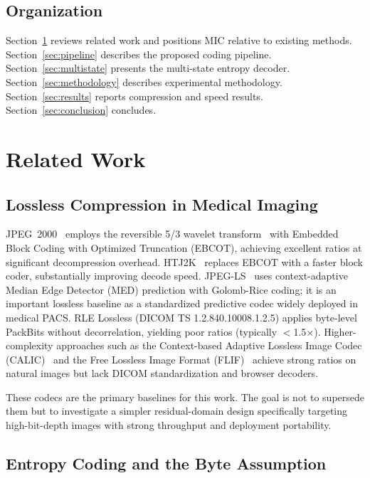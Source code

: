 \documentclass[journal]{IEEEtran}
\begin{document}
\subsection{Organization}

Section~\ref{sec:related} reviews related work and positions MIC relative to
existing methods. Section~\ref{sec:pipeline} describes the proposed coding
pipeline. Section~\ref{sec:multistate} presents the multi-state entropy decoder.
Section~\ref{sec:methodology} describes experimental methodology.
Section~\ref{sec:results} reports compression and speed results.
Section~\ref{sec:conclusion} concludes.

\section{Related Work}
\label{sec:related}

\subsection{Lossless Compression in Medical Imaging}

JPEG~2000~\cite{taubman2002} employs the reversible 5/3 wavelet
transform~\cite{legall1988,calderbank1998} with Embedded Block Coding with
Optimized Truncation (EBCOT), achieving excellent ratios at significant
decompression overhead. HTJ2K~\cite{htj2k2019,taubman2022}
replaces EBCOT with a faster block coder, substantially improving decode
speed. JPEG-LS~\cite{loco1,jpegls2} uses context-adaptive Median Edge
Detector (MED) prediction with Golomb-Rice coding; it is an important
lossless baseline as a standardized predictive codec widely deployed in
medical PACS. RLE Lossless (DICOM TS 1.2.840.10008.1.2.5) applies
byte-level PackBits without decorrelation, yielding poor ratios
(typically $<$1.5$\times$). Higher-complexity approaches such as the
Context-based Adaptive Lossless Image Codec (CALIC)~\cite{wu1997} and the
Free Lossless Image Format (FLIF)~\cite{sneyers2016} achieve strong ratios on
natural images but lack DICOM standardization and browser decoders.

These codecs are the primary baselines for this work. The goal is not to
supersede them but to investigate a simpler residual-domain design specifically
targeting high-bit-depth images with strong throughput and deployment
portability.

\subsection{Entropy Coding and the Byte Assumption}
\end{document}
